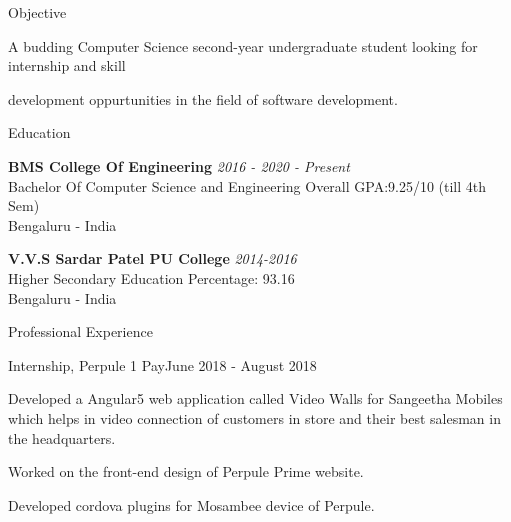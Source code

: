 \documentclass{resume} %
\begin{document}


\begin{rSection}{Objective} \itemsep -2pt
\item A budding Computer Science second-year undergraduate student looking for internship and skill 
\item development oppurtunities in the field of software development.
\end{rSection}

\begin{rSection}{Education}

{\bf BMS College Of Engineering} \hfill {\em 2016 - 2020 - Present} 
\\  Bachelor Of Computer Science and Engineering \hfill { Overall GPA:9.25/10 (till 4th Sem)}
\\ Bengaluru - India

{\bf V.V.S Sardar Patel PU College} \hfill {\em 2014-2016} 
\\  Higher Secondary Education \hfill {Percentage: 93.16 }
\\ Bengaluru - India


\end{rSection}


\begin{rSection}{Professional Experience}

\begin{rSubsection}{Internship, Perpule 1 Pay}{June 2018 - August 2018}{}
\item Developed a Angular5 web application called Video Walls for Sangeetha Mobiles which helps in video connection of customers in store and their best salesman in the headquarters.
\item Worked on the front-end design of Perpule Prime website.
\item Developed cordova plugins for Mosambee device of Perpule.
\end{rSubsection}

\end{rSection}
\end{document}

